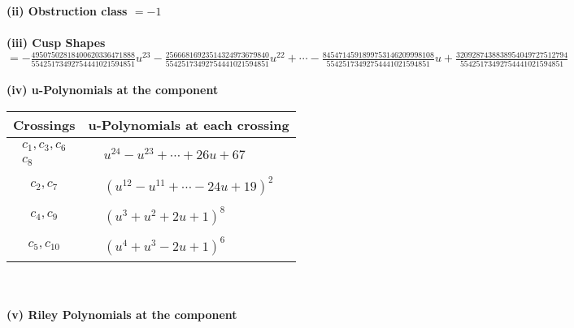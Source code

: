 \documentclass[1p]{elsarticle_modified}
\theoremstyle{definition}
\begin{document}
\flushleft \textbf{(ii) Obstruction class $= -1$}\\~\\
\flushleft \textbf{(iii) Cusp Shapes $= -\frac{49507502818400620336471888}{55425173492754441021594851} u^{23}-\frac{25666816923514324973679840}{55425173492754441021594851} u^{22}+\cdots-\frac{8454714591899753146209998108}{55425173492754441021594851} u+\frac{3209287438838954049727512794}{55425173492754441021594851}$}\\~\\
\newpage\renewcommand{\arraystretch}{1}
\flushleft \textbf{(iv) u-Polynomials at the component}\newline \\
\begin{tabular}{m{50pt}|m{274pt}}
Crossings & \hspace{64pt}u-Polynomials at each crossing \\
\hline $$\begin{aligned}c_{1},c_{3},c_{6}\\c_{8}\end{aligned}$$&$\begin{aligned}
&u^{24}- u^{23}+\cdots+26 u+67
\end{aligned}$\\
\hline $$\begin{aligned}c_{2},c_{7}\end{aligned}$$&$\begin{aligned}
&(u^{12}- u^{11}+\cdots-24 u+19)^{2}
\end{aligned}$\\
\hline $$\begin{aligned}c_{4},c_{9}\end{aligned}$$&$\begin{aligned}
&(u^3+u^2+2 u+1)^8
\end{aligned}$\\
\hline $$\begin{aligned}c_{5},c_{10}\end{aligned}$$&$\begin{aligned}
&(u^4+u^3-2 u+1)^6
\end{aligned}$\\
\hline
\end{tabular}\\~\\
\newpage\renewcommand{\arraystretch}{1}
\flushleft \textbf{(v) Riley Polynomials at the component}\newline \\
\end{document}
